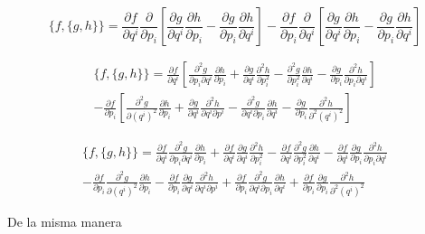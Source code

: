 \documentclass[a4paper,10pt]{article}
\numberwithin{equation}{section}
\begin{document}
\begin{equation}
  \{f,\{g,h\}\} = \frac{\partial f}{\partial q^i}\frac{\partial }{\partial p_i}\left[
   \frac{\partial g}{\partial q^i}\frac{\partial h}{\partial p_i} - 
 \frac{\partial g}{\partial p_i}\frac{\partial h}{\partial q^i}\right] 
 - \frac{\partial f}{\partial p_i}\frac{\partial}{\partial q^i}\left[
   \frac{\partial g}{\partial q^i}\frac{\partial h}{\partial p_i} - 
 \frac{\partial g}{\partial p_i}\frac{\partial h}{\partial q^i}\right] 
\end{equation}

\begin{align}
  \{f,\{g,h\}\} = \frac{\partial f}{\partial q^i}\left[
  \frac{\partial^2 g}{\partial p_i\partial q^i}\frac{\partial h}{\partial p_i} 
  + \frac{\partial g}{\partial q^i}\frac{\partial^2 h}{\partial p_i^2} 
  - \frac{\partial^2 g}{\partial p_i^2}\frac{\partial h}{\partial q^i} 
  - \frac{\partial g}{\partial p_i}\frac{\partial^2 h}{\partial p_i \partial q^i}\right] \\
  - \frac{\partial f}{\partial p_i}\left[\frac{\partial^2 g}{\partial (q^i)^2}
  \frac{\partial h}{\partial p_i} + \frac{\partial g}{\partial q^i}
  \frac{\partial^2 h}{\partial q^i\partial p^i} - \frac{\partial^2 g}{\partial q^i\partial p_i}
  \frac{\partial h}{\partial q^i} - \frac{\partial g}{\partial p_i}
  \frac{\partial^2 h}{\partial^2(q^i)^2}\right]
\end{align}

\begin{align}
  \{f,\{g,h\}\} = \frac{\partial f}{\partial q^i}
  \frac{\partial^2 g}{\partial p_i\partial q^i}\frac{\partial h}{\partial p_i} 
  + \frac{\partial f}{\partial q^i}
  \frac{\partial g}{\partial q^i}\frac{\partial^2 h}{\partial p_i^2} 
  -\frac{\partial f}{\partial q^i}
  \frac{\partial^2 g}{\partial p_i^2}\frac{\partial h}{\partial q^i} 
  -\frac{\partial f}{\partial q^i} 
  \frac{\partial g}{\partial p_i}\frac{\partial^2 h}{\partial p_i \partial q^i} \\
  - \frac{\partial f}{\partial p_i}\frac{\partial^2 g}{\partial (q^i)^2}
  \frac{\partial h}{\partial p_i} - \frac{\partial f}{\partial p_i}\frac{\partial g}{\partial q^i}
  \frac{\partial^2 h}{\partial q^i\partial p^i} + \frac{\partial f}{\partial p_i}\frac{\partial^2 g}{\partial q^i\partial p_i}
  \frac{\partial h}{\partial q^i} + \frac{\partial f}{\partial p_i}\frac{\partial g}{\partial p_i}
  \frac{\partial^2 h}{\partial^2(q^i)^2}
\end{align}

De la misma manera 
\end{document}

